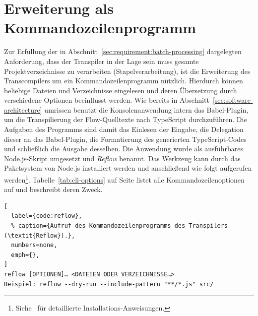 \section{Erweiterung als Kommandozeilenprogramm}
\label{sec:cli-program}

Zur Erfüllung der in Abschnitt~\ref{sec:requirement:batch-processing} dargelegten Anforderung, dass der Transpiler in der Lage sein muss gesamte Projektverzeichnisse zu verarbeiten (Stapelverarbeitung), ist die Erweiterung des Transcompilers um ein Kommandozeilenprogramm nützlich. Hierdurch können beliebige Dateien und Verzeichnisse eingelesen und deren Übersetzung durch verschiedene Optionen beeinflusst werden. Wie bereits in Abschnitt~\ref{sec:software-architecture} umrissen benutzt die Konsolenanwendung intern das Babel-Plugin, um die Transpilierung der Flow-Quelltexte nach TypeScript durchzuführen. Die Aufgaben des Programms sind damit das Einlesen der Eingabe, die Delegation dieser an das Babel-Plugin, die Formatierung des generierten TypeScript-Codes und schließlich die Ausgabe desselben.
Die Anwendung wurde als ausführbares Node.js-Skript umgesetzt und \textit{Reflow} benannt. Das Werkzeug kann durch das Paketsystem von Node.js installiert werden und anschließend wie folgt aufgerufen werden\footnote{Siehe~\autocite{REFLOW_GITHUB} für detaillierte Installations-Anweisungen.}. Tabelle~\ref{tab:cli-options} auf Seite \pageref{tab:cli-options} listet alle Kommandozeilenoptionen auf und beschreibt deren Zweck.

\begin{lstlisting}[
  label={code:reflow},
  % caption={Aufruf des Kommandozeilenprogramms des Transpilers (\textit{Reflow}).},
  numbers=none,
  emph={},
]
reflow [OPTIONEN]… <DATEIEN ODER VERZEICHNISSE…>
Beispiel: reflow --dry-run --include-pattern "**/*.js" src/
\end{lstlisting}



